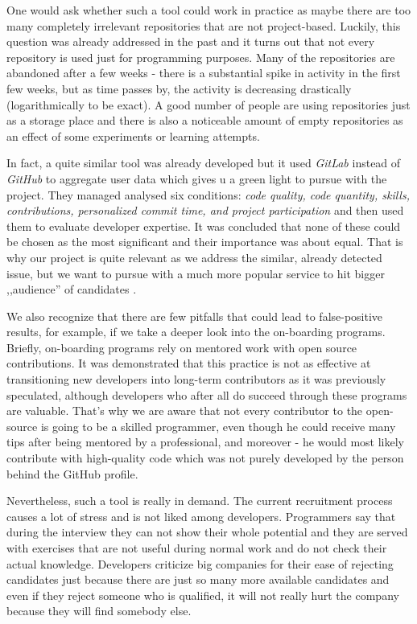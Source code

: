 One would ask whether such a tool could work in practice as maybe there are too many completely irrelevant repositories that are not project-based. Luckily, this question was already addressed in the past and it turns out that not every repository is used just for programming purposes. Many of the repositories are abandoned after a few weeks - there is a substantial spike in activity in the first few weeks, but as time passes by, the activity is decreasing drastically (logarithmically to be exact). A good number of people are using repositories just as a storage place and there is also a noticeable amount of empty repositories as an effect of some experiments or learning attempts.

In fact, a quite similar tool was already developed \cite{GitLabProfilingTool} but it used \emph{GitLab} instead of \emph{GitHub} to aggregate user data which gives u a green light to pursue with the project. They managed analysed six conditions: \emph{code quality, code quantity, skills, contributions, personalized commit time, and project participation} and then used them to evaluate developer expertise. It was concluded that none of these could be chosen as the most significant and their importance was about equal. That is why our project is quite relevant as we address the similar, already detected issue, but we want to pursue with a much more popular service to hit bigger ,,audience'' of candidates \cite{GitLabvsGithub}.

We also recognize that there are few pitfalls that could lead to false-positive results, for example, if we take a deeper look into the on-boarding programs. Briefly, on-boarding programs rely on mentored work with open source contributions. It was demonstrated that this practice is not as effective at transitioning new developers into long-term contributors as it was previously speculated, although developers who after all do succeed through these programs are valuable. \cite{DoOnBoardingProgramsWork} That's why we are aware that not every contributor to the open-source is going to be a skilled programmer, even though he could receive many tips after being mentored by a professional, and moreover - he would most likely contribute with high-quality code which was not purely developed by the person behind the GitHub profile.

Nevertheless, such a tool is really in demand. The current recruitment process causes a lot of stress and is not liked among developers. Programmers say that during the interview they can not show their whole potential and they are served with exercises that are not useful during normal work and do not check their actual knowledge. Developers criticize big companies for their ease of rejecting candidates just because there are just so many more available candidates and even if they reject someone who is qualified, it will not really hurt the company because they will find somebody else. \cite{HiringIsBroken}
